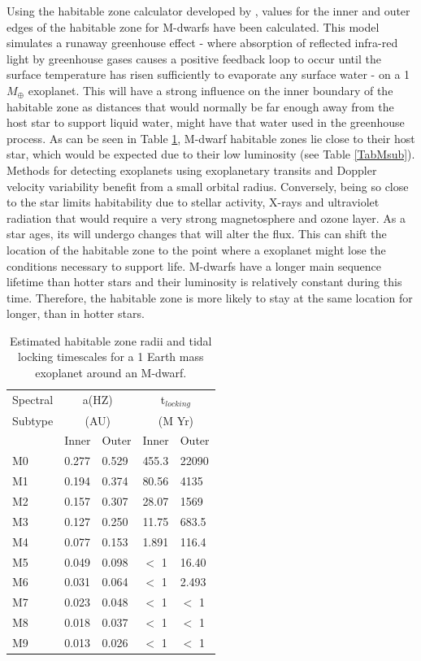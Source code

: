 Using the habitable zone calculator developed by \citet{2013Kopparapu}, values for the inner and outer edges of the habitable zone for M-dwarfs have been calculated. This model simulates a runaway greenhouse effect - where absorption of reflected infra-red light by greenhouse gases causes a positive feedback loop to occur until the surface temperature has risen sufficiently to evaporate any surface water - on a 1 $M_{\oplus}$ exoplanet. This will have a strong influence on the inner boundary of the habitable zone as distances that would normally be far enough away from the host star to support liquid water, might have that water used in the greenhouse process. As can be seen in Table \ref{TabHZTL}, M-dwarf habitable zones lie close to their host star, which would be expected due to their low luminosity (see Table \ref{TabMsub}). Methods for detecting exoplanets using exoplanetary transits and Doppler velocity variability benefit from a small orbital radius. Conversely, being so close to the star limits habitability due to stellar activity, X-rays and ultraviolet radiation that would require a very strong magnetosphere and ozone layer. As a star ages, its will undergo changes that will alter the flux. This can shift the location of the habitable zone to the point where a exoplanet might lose the conditions necessary to support life. M-dwarfs have a longer main sequence lifetime than hotter stars and their luminosity is relatively constant during this time. Therefore, the habitable zone is more likely to stay at the same location for longer, than in hotter stars.\\
\begin{table}
\centering
\begin{tabular}{|l|l|l|l|l|}
\hline
Spectral& \multicolumn{2}{|c|}{a(HZ)} & \multicolumn{2}{|c|}{t$_{locking}$}\\
Subtype & \multicolumn{2}{|c|}{(AU)} & \multicolumn{2}{|c|}{(M Yr)}\\
\cline{2-5}
 & Inner & Outer & Inner & Outer\\
\hline
M0 & 0.277 & 0.529 & 455.3 & 22090\\
M1 & 0.194 & 0.374 & 80.56 & 4135\\
M2 & 0.157 & 0.307 & 28.07 & 1569\\
M3 & 0.127 & 0.250 & 11.75 & 683.5\\
M4 & 0.077 & 0.153 & 1.891 & 116.4\\
M5 & 0.049 & 0.098 & $<$ 1 & 16.40\\
M6 & 0.031 & 0.064 & $<$ 1 & 2.493\\
M7 & 0.023 & 0.048 & $<$ 1 & $<$ 1\\
M8 & 0.018 & 0.037 & $<$ 1 & $<$ 1\\
M9 & 0.013 & 0.026 & $<$ 1 & $<$ 1\\
\hline
\end{tabular}
\caption{Estimated habitable zone radii and tidal locking timescales for a 1 Earth mass exoplanet around an M-dwarf.}
\label{TabHZTL}
\end{table}
